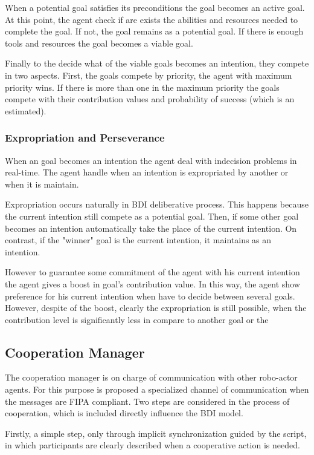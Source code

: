 When a potential goal satisfies its preconditions the goal becomes an active goal. At this point, the agent check if are exists the abilities and resources needed to complete the goal. If not, the goal remains as a potential goal. If there is enough tools and resources the goal becomes a viable goal. 

Finally to the decide what of the viable goals becomes an intention, they compete in two aspects. First, the goals compete by priority, the agent with maximum priority wins. If there is more than one in the maximum priority the goals compete with their contribution values and probability of success (which is an estimated).

\subsubsection{Expropriation and Perseverance}

When an goal becomes an intention the agent deal with indecision problems in real-time. The agent handle when an intention is expropriated by another or when it is maintain.

Expropriation occurs naturally in BDI deliberative process. This happens because the current intention still compete as a potential goal. Then, if some other goal becomes an intention automatically take the place of the current intention. On contrast, if the "winner" goal is the current intention, it maintains as an intention.

However to guarantee some commitment of the agent with his current intention the agent gives a boost in goal's contribution value. In this way, the agent show preference for his current intention when have to decide between several goals. However, despite of the boost, clearly the expropriation is still possible, when the contribution level  is significantly less in compare to another goal or the 


\subsection{Cooperation Manager}

The cooperation manager is on charge of communication with other robo-actor agents. For this purpose is proposed a specialized channel of communication when the messages are FIPA compliant. Two steps are considered in the process of cooperation, which is included directly influence the BDI model. 

Firstly, a simple step, only through implicit synchronization guided by the script, in which participants are clearly described when a cooperative action is needed.

